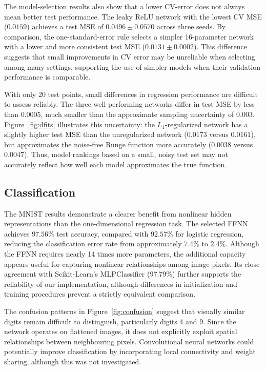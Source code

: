 \documentclass[amssymb,twocolumn,aps]{revtex4}
\begin{document}
The model-selection results also show that a lower CV-error does not always mean better test performance. The leaky ReLU network with the lowest CV MSE ($0.0159$) achieves a test MSE of $0.0496\pm0.0570$ across three seeds. By comparison, the one-standard-error rule selects a simpler 16-parameter network with a lower and more consistent test MSE ($0.0131\pm0.0002$). This difference suggests that small improvements in CV error may be unreliable when selecting among many settings, supporting the use of simpler models when their validation performance is comparable.

With only 20 test points, small differences in regression performance are difficult to assess reliably. The three well-performing networks differ in test MSE by less than $0.0005$, much smaller than the approximate sampling uncertainty of $0.003$. Figure~\ref{fig:dfits} illustrates this uncertainty: the $L_1$-regularized network has a slightly higher test MSE than the unregularized network ($0.0173$ versus $0.0161$), but approximates the noise-free Runge function more accurately ($0.0038$ versus $0.0047$). Thus, model rankings based on a small, noisy test set may not accurately reflect how well each model approximates the true function.


\subsection{Classification}
The MNIST results demonstrate a clearer benefit from nonlinear hidden representations than the one-dimensional regression task. The selected FFNN achieves $97.56\%$ test accuracy, compared with $92.57\%$ for logistic regression, reducing the classification error rate from approximately $7.4\%$ to $2.4\%$. Although the FFNN requires nearly 14 times more parameters, the additional capacity appears useful for capturing nonlinear relationships among image pixels. Its close agreement with Scikit-Learn's MLPClassifier ($97.79\%$) further supports the reliability of our implementation, although differences in initialization and training procedures prevent a strictly equivalent comparison.

The confusion patterns in Figure~\ref{fig:confusion} suggest that visually similar digits remain difficult to distinguish, particularly digits 4 and 9. Since the network operates on flattened images, it does not explicitly exploit spatial relationships between neighbouring pixels. Convolutional neural networks could potentially improve classification by incorporating local connectivity and weight sharing, although this was not investigated.
\end{document}
